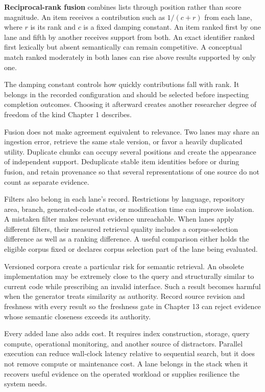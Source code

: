 \textbf{Reciprocal-rank fusion} combines lists through position rather than score magnitude. An item receives a contribution such as \(1/(c+r)\) from each lane, where \(r\) is its rank and \(c\) is a fixed damping constant. An item ranked first by one lane and fifth by another receives support from both. An exact identifier ranked first lexically but absent semantically can remain competitive. A conceptual match ranked moderately in both lanes can rise above results supported by only one.

The damping constant controls how quickly contributions fall with rank. It belongs in the recorded configuration and should be selected before inspecting completion outcomes. Choosing it afterward creates another researcher degree of freedom of the kind Chapter 1 describes.

Fusion does not make agreement equivalent to relevance. Two lanes may share an ingestion error, retrieve the same stale version, or favor a heavily duplicated utility. Duplicate chunks can occupy several positions and create the appearance of independent support. Deduplicate stable item identities before or during fusion, and retain provenance so that several representations of one source do not count as separate evidence.

Filters also belong in each lane's record. Restrictions by language, repository area, branch, generated-code status, or modification time can improve isolation. A mistaken filter makes relevant evidence unreachable. When lanes apply different filters, their measured retrieval quality includes a corpus-selection difference as well as a ranking difference. A useful comparison either holds the eligible corpus fixed or declares corpus selection part of the lane being evaluated.

Versioned corpora create a particular risk for semantic retrieval. An obsolete implementation may be extremely close to the query and structurally similar to current code while prescribing an invalid interface. Such a result becomes harmful when the generator treats similarity as authority. Record source revision and freshness with every result so the freshness gate in Chapter 13 can reject evidence whose semantic closeness exceeds its authority.

Every added lane also adds cost. It requires index construction, storage, query compute, operational monitoring, and another source of distractors. Parallel execution can reduce wall-clock latency relative to sequential search, but it does not remove compute or maintenance cost. A lane belongs in the stack when it recovers useful evidence on the operated workload or supplies resilience the system needs.


